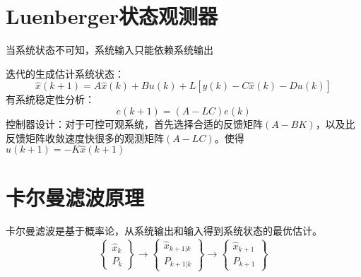 \section{Luenberger状态观测器}
当系统状态不可知，系统输入只能依赖系统输出
\begin{theorembox}
	迭代的生成估计系统状态：
	\begin{equation*}
  \hat{x}(k+1) = A \hat{x}(k) + Bu(k) + L[y(k) - C\hat{x}(k) - Du(k)]
\end{equation*}
有系统稳定性分析：
\begin{equation*}
  e(k+1) = (A-LC)e(k)
\end{equation*}
控制器设计：对于可控可观系统，首先选择合适的反馈矩阵$(A-BK)$，以及比反馈矩阵收敛速度快很多的观测矩阵$(A-LC)$。使得$u(k+1) = -K\hat{x}(k+1)$
\end{theorembox}
\section{卡尔曼滤波原理}
卡尔曼滤波是基于概率论，从系统输出和输入得到系统状态的最优估计。
\begin{equation*}
  \begin{Bmatrix}
  	\hat{x}_k \\ P_k
  \end{Bmatrix}
  \longrightarrow
  \begin{Bmatrix}
  	\hat{x}_{k+1|k}\\ P_{k+1|k}
  \end{Bmatrix}
  \longrightarrow
  \begin{Bmatrix}
  	\hat{x}_{k+1} \\ P_{k+1}
  \end{Bmatrix}
\end{equation*}

